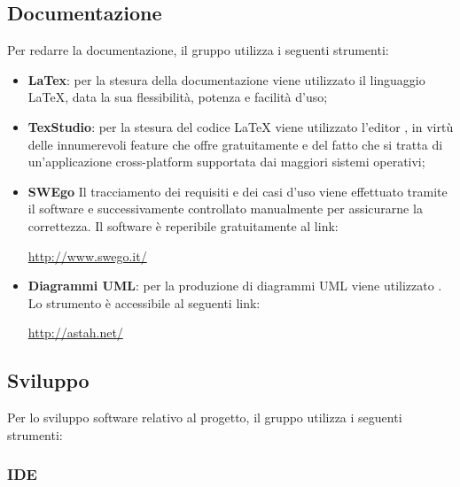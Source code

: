 \documentclass[../NormediProgetto.tex]{subfiles}
\begin{document}
	
	\subsection{Documentazione}
	
	
	Per redarre la documentazione, il gruppo utilizza i seguenti strumenti:
	
	\begin{itemize}
		\item \textbf{LaTex}: per la stesura della documentazione viene utilizzato il linguaggio \LaTeX{}, data la sua flessibilità, potenza e facilità d'uso;
		
		\item \textbf{TexStudio}: per la stesura del codice \LaTeX{} viene utilizzato l’editor , in virtù delle innumerevoli feature che offre gratuitamente e del fatto che si tratta di un'applicazione cross-platform supportata dai maggiori sistemi operativi;
		
		\item \textbf{SWEgo} Il tracciamento dei requisiti e dei casi d'uso viene effettuato tramite il software  e successivamente controllato manualmente per assicurarne la correttezza. Il software è reperibile gratuitamente al link:
		\begin{center}
			\url{http://www.swego.it/}
		\end{center}
		
		\item \textbf{Diagrammi UML}: per la produzione di diagrammi UML viene utilizzato . Lo strumento è accessibile al seguenti link: 
		
		\begin{center}
			\centerline{\url{http://astah.net/}}
		\end{center}
			
	\end{itemize}


	\subsection{Sviluppo}

	Per lo sviluppo software relativo al progetto, il gruppo utilizza i seguenti strumenti:

	\subsubsection{IDE}
\end{document}
